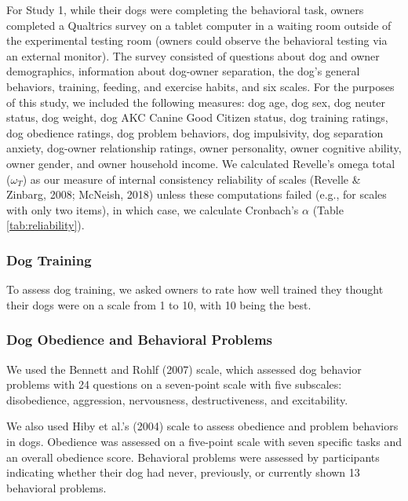 \documentclass[
  pub,floatsintext]{apa6}
\begin{document}
For Study 1, while their dogs were completing the behavioral task, owners completed a Qualtrics survey on a tablet computer in a waiting room outside of the experimental testing room (owners could observe the behavioral testing via an external monitor). The survey consisted of questions about dog and owner demographics, information about dog-owner separation, the dog's general behaviors, training, feeding, and exercise habits, and six scales. For the purposes of this study, we included the following measures: dog age, dog sex, dog neuter status, dog weight, dog AKC Canine Good Citizen status, dog training ratings, dog obedience ratings, dog problem behaviors, dog impulsivity, dog separation anxiety, dog-owner relationship ratings, owner personality, owner cognitive ability, owner gender, and owner household income. We calculated Revelle's omega total (\(\omega_{T}\)) as our measure of internal consistency reliability of scales (Revelle \& Zinbarg, 2008; McNeish, 2018) unless these computations failed (e.g., for scales with only two items), in which case, we calculate Cronbach's \(\alpha\) (Table \ref{tab:reliability}).

\hypertarget{dog-training}{%
\subsubsection{Dog Training}\label{dog-training}}

To assess dog training, we asked owners to rate how well trained they thought their dogs were on a scale from 1 to 10, with 10 being the best.

\hypertarget{dog-obedience-and-behavioral-problems}{%
\subsubsection{Dog Obedience and Behavioral Problems}\label{dog-obedience-and-behavioral-problems}}

We used the Bennett and Rohlf (2007) scale, which assessed dog behavior problems with 24 questions on a seven-point scale with five subscales: disobedience, aggression, nervousness, destructiveness, and excitability.

We also used Hiby et al.'s (2004) scale to assess obedience and problem behaviors in dogs. Obedience was assessed on a five-point scale with seven specific tasks and an overall obedience score. Behavioral problems were assessed by participants indicating whether their dog had never, previously, or currently shown 13 behavioral problems.
\end{document}
